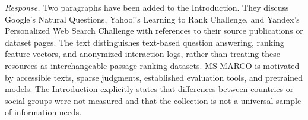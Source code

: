 \emph{Response.} Two paragraphs have been added to the Introduction. They discuss Google's Natural Questions, Yahoo!'s Learning to Rank Challenge, and Yandex's Personalized Web Search Challenge with references to their source publications or dataset pages. The text distinguishes text-based question answering, ranking feature vectors, and anonymized interaction logs, rather than treating these resources as interchangeable passage-ranking datasets. MS MARCO is motivated by accessible texts, sparse judgments, established evaluation tools, and pretrained models. The Introduction explicitly states that differences between countries or social groups were not measured and that the collection is not a universal sample of information needs.
